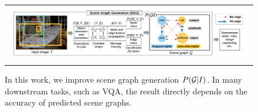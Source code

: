 \begin{figure}[t]
	\centering
	\begin{scriptsize}
		\setlength{\tabcolsep}{1pt}
		\begin{tabular}{c} \includegraphics[width=0.99\textwidth,align=c,trim={0 0.2cm 0 0.2cm},clip]{cup_on_surfboard_overview1.pdf} \\
		\end{tabular}
	\end{scriptsize}
	\vspace{-5pt}
	\caption{\small In this work, we improve scene graph generation $P({\cal G} | I)$. In many downstream tasks, such as VQA, the result directly depends on the accuracy of predicted scene graphs.}
	\label{fig:overview}
\end{figure}

